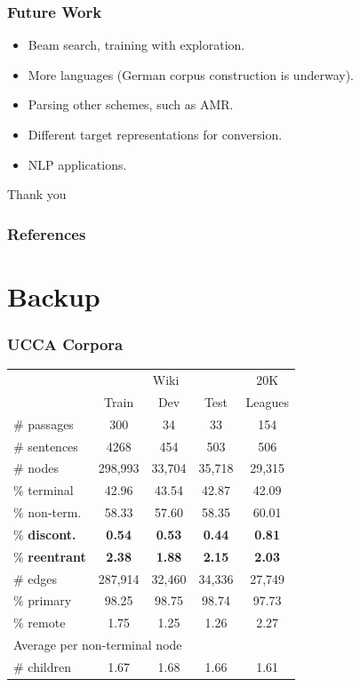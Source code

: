 \documentclass[t]{beamer}
\begin{document}
\begin{frame}
\frametitle{Future Work}
\begin{itemize}
 \item Beam search, training with exploration.
 \item More languages (German corpus construction is underway).
 \item Parsing other schemes, such as AMR.
 \item Different target representations for conversion.
 \item NLP applications.
\end{itemize}
\end{frame}



\begin{frame}
\vfill
\begin{center}
\LARGE
Thank you
\end{center}
\end{frame}



\begin{frame}[allowframebreaks]
\frametitle{References}

\tiny
\end{frame}


\section{Backup}


\begin{frame}
\frametitle{UCCA Corpora}
\centering
\begin{tabular}{l|ccc|c}
	& \multicolumn{3}{c|}{Wiki} & 20K \\
	& \small Train & \small Dev & \small Test & Leagues \\
	\hline
	\# passages & 300 & 34 & 33 & 154 \\
	\# sentences & 4268 & 454 & 503 & 506 \\
	\hline
	\# nodes & 298,993 & 33,704 & 35,718 & 29,315 \\
	\% terminal & 42.96 & 43.54 & 42.87 & 42.09 \\
	\% non-term. & 58.33 & 57.60 & 58.35 & 60.01 \\
	\% \textbf{discont.} & \textbf{0.54} & \textbf{0.53} & \textbf{0.44} & \textbf{0.81} \\
	\% \textbf{reentrant} & \textbf{2.38} & \textbf{1.88} & \textbf{2.15} & \textbf{2.03} \\
	\hline
	\# edges & 287,914 & 32,460 & 34,336 & 27,749 \\
	\% primary & 98.25 & 98.75 & 98.74 & 97.73 \\
	\% remote & 1.75 & 1.25 & 1.26 & 2.27 \\
	\hline
	\multicolumn{3}{l}{\footnotesize Average per non-terminal node} \\
	\# children & 1.67 & 1.68 & 1.66 & 1.61 
\end{tabular}
\end{frame}
\end{document}
